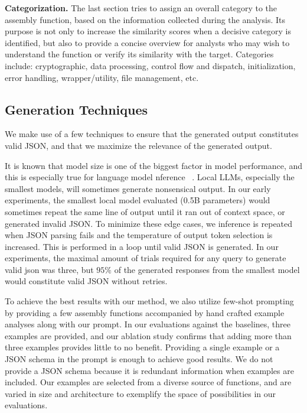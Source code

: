 \noindent \textbf{Categorization.}
The last section tries to assign an overall category to the assembly function, based on the information collected during the analysis.
Its purpose is not only to increase the similarity scores when a decisive category
is identified, but also to provide a concise overview for analysts who may wish to understand
the function or verify its similarity with the target. Categories include: cryptographic, data processing, control flow and dispatch,
initialization, error handling, wrapper/utility, file management, etc.

\subsection{Generation Techniques}

We make use of a few techniques to ensure that the generated output constitutes valid JSON, and that we maximize the relevance
of the generated output.

It is known that model size is one of the biggest factor in model performance, and this is especially true for language model 
nference ~\cite{scaling-laws}. 
Local LLMs, especially the smallest models, will sometimes generate nonsensical output. In our early experiments, the smallest local model
evaluated (0.5B parameters) would sometimes repeat the same line of output until it ran out of context space, or generated invalid JSON.
To minimize these edge cases, we inference is repeated when JSON parsing fails and the temperature of output token selection is increased.
This is performed in a loop until valid JSON is generated. In our experiments, the maximal amount of trials required
for any query to generate valid json was three, but \(95\%\) of the generated responses from the smallest model would constitute
valid JSON without retries.

To achieve the best results with our method, we also utilize few-shot prompting ~\cite{few-shot} by providing
a few assembly functions accompanied by hand crafted example analyses along with our prompt.
In our evaluations against the baselines, three examples are provided, and our ablation study confirms that adding more than three examples provides
little to no benefit. Providing a single example or a JSON schema in the prompt is enough to achieve good results. We do not
provide a JSON schema because it is redundant information when examples are included. Our examples are selected from a
diverse source of functions, and are varied in size and architecture to exemplify the space of possibilities in our evaluations.


